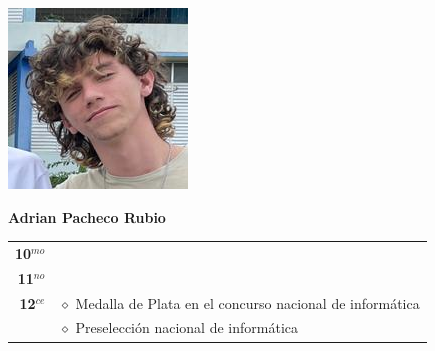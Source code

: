 \begin{minipage}{0.2\textwidth}
	\includegraphics[width=\linewidth]{img/concursantes/adrian.png} %
\end{minipage}
\hfill
\begin{minipage}{0.7\textwidth}
	\textbf{Adrian Pacheco Rubio}
	
	\vspace*{0.1in}
	\begin{tabular}{rl}
		
		\textbf{10$^{mo}$} &   \\
		
		\textbf{11$^{no}$} &  \\
		
		\textbf{12$^{ce}$} 
		& $\diamond$ Medalla de Plata en el concurso nacional de informática \\
		& $\diamond$ Preselección nacional de informática  \\
		
		
	\end{tabular}
\end{minipage}

